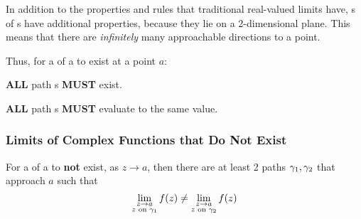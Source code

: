 In addition to the properties and rules that traditional real-valued limits have, s of s have additional properties, because they lie on a 2-dimensional plane.
This means that there are \textit{infinitely} many approachable directions to a point.

Thus, for a  of a  to exist at a point $a$:
\begin{propertylist}
\item \textbf{ALL} path s \textbf{MUST} exist.
\item \textbf{ALL} path s \textbf{MUST} evaluate to the same value.
\end{propertylist}

\subsubsection{Limits of Complex Functions that Do Not Exist}\label{subsubsec:Complex_Limit_DNE}
For a  of a  to \textbf{not} exist, as $z \to a$, then there are at least 2 paths $\gamma_{1}, \gamma_{2}$ that approach $a$ such that
\begin{equation}\label{eq:Complex_Limit_DNE}
  \lim\limits_{\substack{z \to a \\ z \text{ on } \gamma_{1}}} f(z) \neq \lim\limits_{\substack{z \to a \\ z \text{ on } \gamma_{2}}} f(z)
\end{equation}


